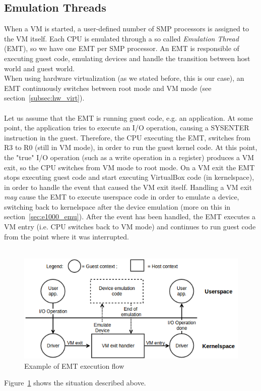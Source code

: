 \documentclass[a4paper, 12pt, titlepage]{report}
\begin{document}
\subsection{Emulation Threads} \label{subsec:EMT}
When a VM is started, a user-defined number of SMP processors is assigned to the VM itself. Each CPU is emulated through a so called \textit{Emulation Thread} (EMT), so we have one EMT per SMP processor. An EMT is responsible of executing guest code, emulating devices and handle the transition between host world and guest world. 
\\
When using hardware virtualization (as we stated before, this is our case), an EMT continuously switches between root mode and VM mode (see section~\ref{subsec:hw_virt}).
\\
\\
Let us assume that the EMT is running guest code, e.g. an application. At some point, the application tries to execute an I/O operation, causing a SYSENTER instruction in the guest. Therefore, the CPU executing the EMT, switches from R3 to R0 (still in VM mode), in order to run the guest kernel code. At this point, the "true" I/O operation (such as a write operation in a register) produces a VM exit, so the CPU switches from VM mode to root mode. On a VM exit the EMT stops executing guest code and start executing VirtualBox code (in kernelspace), in order to handle the event that caused the VM exit itself. Handling a VM exit \textit{may} cause the EMT to execute userspace code in order to emulate a device, switching back to kernelspace after the device emulation (more on this in section~\ref{sec:e1000_emu}). After the event has been handled, the EMT executes a VM entry (i.e. CPU switches back to VM mode) and continues to run guest code from the point where it was interrupted.
\\
\\
\begin{figure}[!ht]
	\centering
	 	\includegraphics[scale=.75]{img/emt_flow.png}
	 	\caption{Example of EMT execution flow}
	 	\label{img:emt_flow}
\end{figure}
Figure~\ref{img:emt_flow} shows the situation described above.
\end{document}
